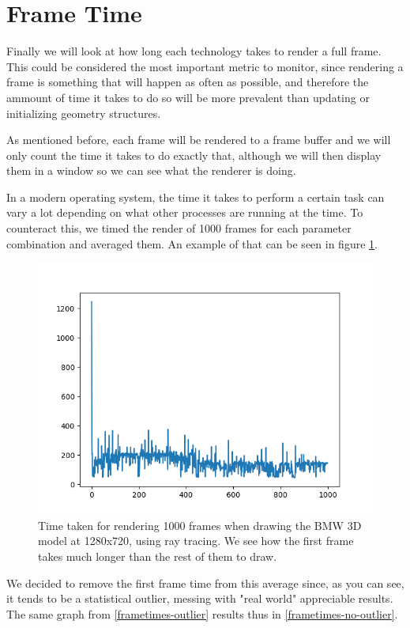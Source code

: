 \section{Frame Time}
Finally we will look at how long each technology takes to render a full frame. This could be considered the most important metric to monitor, since rendering a frame is something that will happen as often as possible, and therefore the ammount of time it takes to do so will be more prevalent than updating or initializing geometry structures.

As mentioned before, each frame will be rendered to a frame buffer and we will only count the time it takes to do exactly that, although we will then display them in a window so we can see what the renderer is doing.

In a modern operating system, the time it takes to perform a certain task can vary a lot depending on what other processes are running at the time. To counteract this, we timed the render of 1000 frames for each parameter combination and averaged them. An example of that can be seen in figure \ref{frametimes-outlier-graph}.

\begin{figure}[hbt!]
    \centering
    \includegraphics[width=1.0\textwidth]{figuras/frametime-outlier.png}
    \caption{Time taken for rendering 1000 frames when drawing the BMW 3D model at 1280x720, using ray tracing. We see how the first frame takes much longer than the rest of them to draw.}
    \label{frametimes-outlier-graph}
\end{figure}

We decided to remove the first frame time from this average since, as you can see, it tends to be a statistical outlier, messing with "real world" appreciable results. The same graph from \ref{frametimes-outlier} results thus in \ref{frametimes-no-outlier}.

